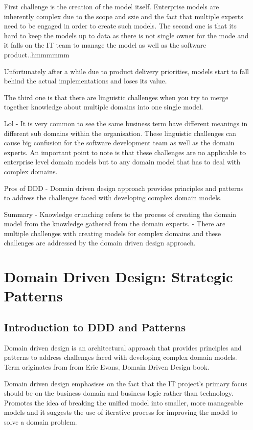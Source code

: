 First challenge is the creation of the model itself.
Enterprise models are inherently complex due to the scope and szie and the fact that multiple experts need to be engaged in order to create such models.
The second one is that its hard to keep the models up to data as there is not single owner for the mode and it falls on the IT team to manage the model as well as the software product..hmmmmmm

Unfortunately after a while due to product delivery priorities, models start to fall behind the actual implementations and loses its value.

The third one is that there are linguistic challenges when you try to merge together knowledge about multiple domains into one single model.

Lol - It is very common to see the same business term have different meanings in different sub domains within the organisation.
These linguistic challenges can cause big confusion for the software development team as well as the domain experts.
An important point to note is that these challenges are no applicable to enterprise level domain models but to any domain model that has to deal with complex domains.

Pros of DDD
- Domain driven design approach provides principles and patterns to address the challenges faced with developing complex domain models.

Summary
- Knowledge crunching refers to the process of creating the domain model from the knowledge gathered from the domain experts.
- There are multiple challenges with creating models for complex domains and these challenges are addressed by the domain driven design approach.

\chapter{Domain Driven Design: Strategic Patterns}

\section{Introduction to DDD and Patterns}
Domain driven design is an architectural approach that provides principles and patterns to address challenges faced with developing complex domain models.
Term originates from from Eric Evans, Domain Driven Design book.

Domain driven design emphasises on the fact that the IT project's primary focus should be on the business domain and business logic rather than technology.
Promotes the idea of breaking the unified model into smaller, more manageable models and it suggests the use of iterative process for improving the model to solve a domain problem.


